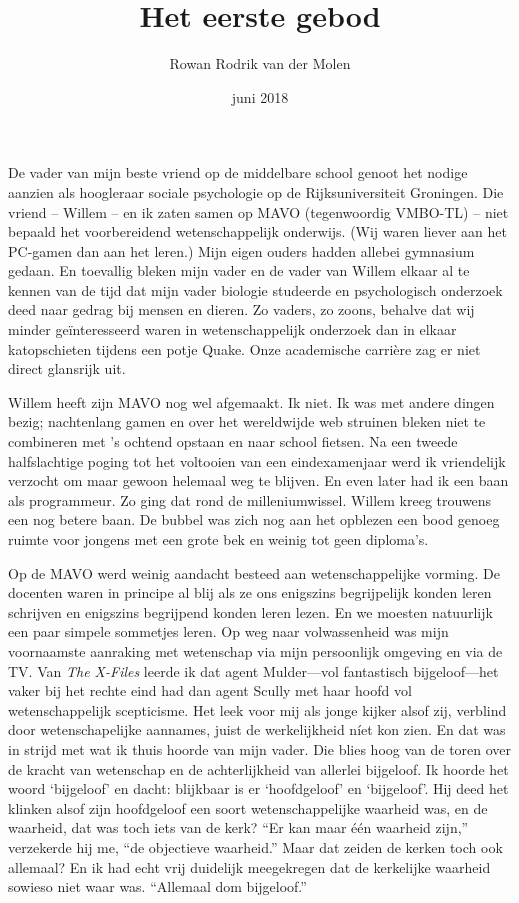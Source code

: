\documentclass[12pt,a4paper]{article}
\begin{document}
\title{Het eerste gebod}
\author{Rowan Rodrik van der Molen}
\date{juni 2018}
\maketitle


De vader van mijn beste vriend op de middelbare school genoot het nodige aanzien als hoogleraar sociale psychologie op de Rijksuniversiteit Groningen. Die vriend – Willem – en ik zaten samen op MAVO (tegenwoordig VMBO-TL) – niet bepaald het voorbereidend wetenschappelijk onderwijs. (Wij waren liever aan het PC-gamen dan aan het leren.) Mijn eigen ouders hadden allebei gymnasium gedaan. En toevallig bleken mijn vader en de vader van Willem elkaar al te kennen van de tijd dat mijn vader biologie studeerde en psychologisch onderzoek deed naar gedrag bij mensen en dieren. Zo vaders, zo zoons, behalve dat wij minder geïnteresseerd waren in wetenschappelijk onderzoek dan in elkaar katopschieten tijdens een potje Quake. Onze academische carrière zag er niet direct glansrijk uit.

Willem heeft zijn MAVO nog wel afgemaakt. Ik niet. Ik was met andere dingen bezig; nachtenlang gamen en over het wereldwijde web struinen bleken niet te combineren met 's ochtend opstaan en naar school fietsen. Na een tweede halfslachtige poging tot het voltooien van een eindexamenjaar werd ik vriendelijk verzocht om maar gewoon helemaal weg te blijven. En even later had ik een baan als programmeur. Zo ging dat rond de milleniumwissel. Willem kreeg trouwens een nog betere baan. De bubbel was zich nog aan het opblezen een bood genoeg ruimte voor jongens met een grote bek en weinig tot geen diploma's.

Op de MAVO werd weinig aandacht besteed aan wetenschappelijke vorming. De docenten waren in principe al blij als ze ons enigszins begrijpelijk konden leren schrijven en enigszins begrijpend konden leren lezen. En we moesten natuurlijk een paar simpele sommetjes leren. Op weg naar volwassenheid was mijn voornaamste aanraking met wetenschap via mijn persoonlijk omgeving en via de TV. Van \emph{The X-Files} leerde ik dat agent Mulder—vol fantastisch bijgeloof—het vaker bij het rechte eind had dan agent Scully met haar hoofd vol wetenschappelijk scepticisme. Het leek voor mij als jonge kijker alsof zij, verblind door wetenschapelijke aannames, juist de werkelijkheid níet kon zien. En dat was in strijd met wat ik thuis hoorde van mijn vader. Die blies hoog van de toren over de kracht van wetenschap en de achterlijkheid van allerlei bijgeloof. Ik hoorde het woord ‘bijgeloof’ en dacht: blijkbaar is er ‘hoofdgeloof’ en ‘bijgeloof’. Hij deed het klinken alsof zijn hoofdgeloof een soort wetenschappelijke waarheid was, en de waarheid, dat was toch iets van de kerk? “Er kan maar één waarheid zijn,” verzekerde hij me, “de objectieve waarheid.” Maar dat zeiden de kerken toch ook allemaal? En ik had echt vrij duidelijk meegekregen dat de kerkelijke waarheid sowieso niet waar was. “Allemaal dom bijgeloof.”
\end{document}
